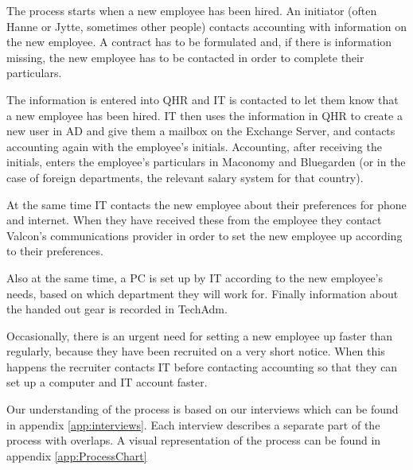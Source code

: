 The process starts when a new employee has been hired.
An initiator (often Hanne or Jytte, sometimes other people) contacts accounting with information on the new employee.
A contract has to be formulated and, if there is information missing, the new employee has to be contacted in order to complete their particulars.

The information is entered into QHR and IT is contacted to let them know that a new employee has been hired.
IT then uses the information in QHR to create a new user in AD and give them a mailbox on the Exchange Server, and contacts accounting again with the employee's initials.
Accounting, after receiving the initials, enters the employee's particulars in Maconomy and Bluegarden (or in the case of foreign departments, the relevant salary system for that country).

At the same time IT contacts the new employee about their preferences for phone and internet.
When they have received these from the employee they contact Valcon's communications provider in order to set the new employee up according to their preferences.

Also at the same time, a PC is set up by IT according to the new employee's needs, based on which department they will work for.
Finally information about the handed out gear is recorded in TechAdm.

Occasionally, there is an urgent need for setting a new employee up faster than regularly, because they have been recruited on a very short notice. When this happens the recruiter contacts IT before contacting accounting so that they can set up a computer and IT account faster.

Our understanding of the process is based on our interviews which can be found in appendix \ref{app:interviews}. Each interview describes a separate part of the process with overlaps.
A visual representation of the process can be found in appendix \ref{app:ProcessChart}